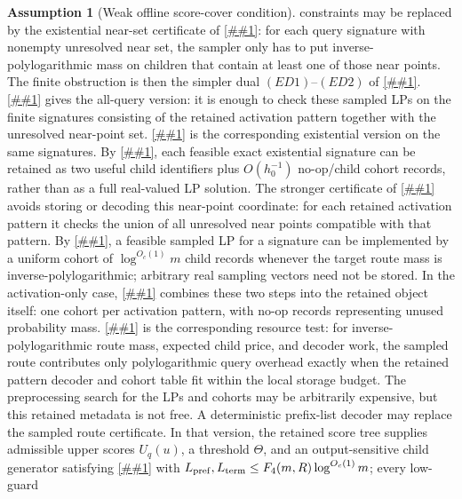 \documentclass[10pt]{article}
\newcommand{\cref}[1]{\ref{##1}}
\newcommand{\Cref}[1]{\ref{##1}}
\theoremstyle{definition}
\newtheorem{assumption}[theorem]{Assumption}
\begin{document}
\begin{assumption}[Weak offline score-cover condition]
   constraints may be replaced by the existential near-set certificate of
   \cref{lem:existential-sampled-priced-cover}: for each query signature with
   nonempty unresolved near set, the sampler only has to put
   inverse-polylogarithmic mass on children that contain at least one of those
   near points.  The finite obstruction is then the simpler dual
   \((ED1)\)--\((ED2)\) of
   \cref{lem:finite-existential-sampled-cover-dual}.
   \Cref{lem:finite-sampled-route-verifier} gives the all-query version: it is
   enough to check these sampled LPs on the finite signatures consisting of the
   retained activation pattern together with the unresolved near-point set.
   \Cref{lem:finite-existential-sampled-route-verifier} is the corresponding
   existential version on the same signatures.
   By \cref{lem:two-child-existential-sampler}, each feasible exact
   existential signature can be retained as two useful child identifiers plus
   \(O(h_0^{-1})\) no-op/child cohort records, rather than as a full
   real-valued LP solution.
   The stronger certificate of
   \cref{lem:activation-sampled-route-verifier} avoids storing or decoding this
   near-point coordinate: for each retained activation pattern it checks the
   union of all unresolved near points compatible with that pattern.
   By \cref{lem:sampled-route-cohort}, a feasible sampled LP for a signature
   can be implemented by a uniform cohort of
   \(\log^{O_c(1)}m\) child records whenever the target route mass is
   inverse-polylogarithmic; arbitrary real sampling vectors need not be stored.
   In the activation-only case,
   \cref{lem:activation-cohort-sampled-compiler} combines these two steps into
   the retained object itself: one cohort per activation pattern, with no-op
   records representing unused probability mass.
   \Cref{cor:activation-cohort-resources} is the corresponding resource test:
   for inverse-polylogarithmic route mass, expected child price, and decoder
   work, the sampled route contributes only polylogarithmic query overhead
   exactly when the retained pattern decoder and cohort table fit within the
   local storage budget.  The preprocessing search for the LPs and cohorts may
   be arbitrarily expensive, but this retained metadata is not free.
   A deterministic prefix-list decoder may replace the sampled route
   certificate.  In that version, the retained score tree supplies admissible
   upper scores \(U_q(u)\), a threshold \(\Theta\), and an output-sensitive
   child generator satisfying \cref{cor:prefix-list-resources} with
   \(L_{\rm pref},L_{\rm term}\le F_4(m,R)\log^{O_c(1)}m\); every low-guard

\end{assumption}
\end{document}
